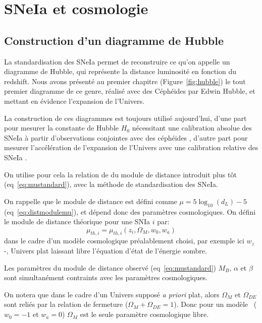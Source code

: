\documentclass[../main/main.tex]{subfiles}
\begin{document}
\section{SNeIa et cosmologie}

\subsection{Construction d'un diagramme de Hubble}

La standardisation des SNeIa permet de reconstruire ce qu'on appelle un
diagramme de Hubble, qui représente la distance luminosité en fonction
du redshift. Nous avons présenté au premier chapitre
(Figure~\ref{fig:hubble}) le tout premier diagramme de ce genre, réalisé
avec des Céphéides par Edwin Hubble, et mettant en évidence l'expansion
de l'Univers.

La construction de ces diagrammes est toujours utilisé aujourd'hui,
d'une part pour
mesurer la constante de Hubble $H_{0}$ nécessitant une calibration absolue des
SNeIa à partir d'observations conjointes avec des céphéides \citep{Riess2016}, d'autre
part pour mesurer l'accélération de l'expansion de l'Univers avec une
calibration relative des SNeIa \citep{Riess1998, Perlmutter1999,
  Betoule2014}.

On utilise pour cela la relation de \citet{Tripp1998} du module de
distance introduit plus tôt (eq~\ref{eq:mustandard}), avec la méthode de
standardisation des SNeIa. 

On rappelle que le module de distance est défini comme
$\mu=5\log_{10}(d_{L})-5$ (eq~\ref{eq:distmodulemu}), et dépend donc des paramètres cosmologiques.
On défini le module de distance théorique pour une SNIa $i$ par:
\begin{equation}
  \label{eq:mutheo}
  \mu_{th,i} = \mu_{th,i}\left(z_{i}, \Omega_{M}, w_{0}, w_{a}\right)
\end{equation}
dans le cadre d'un modèle cosmologique préalablement choisi, par exemple
ici $w_{z}$-\lcdm, Univers plat laissant libre l'équation d'état de
l'énergie sombre. 

Les paramètres du module de distance
observé (eq~\ref{eq:mustandard}) $M_{B}$, $\alpha$ et
$\beta$ sont simultanément contraints avec les paramètres cosmologiques.

On notera que dans le cadre d'un Univers supposé \textit{a priori} plat,
alors $\Omega_{M}$ et $\Omega_{DE}$ sont reliés par la relation de
fermeture ($\Omega_{M}+\Omega_{DE}=1$). Donc pour un modèle \lcdm\
($w_{0}=-1$ et $w_{a}=0$) $\Omega_{M}$ est le seule paramètre cosmologique libre.
\end{document}
